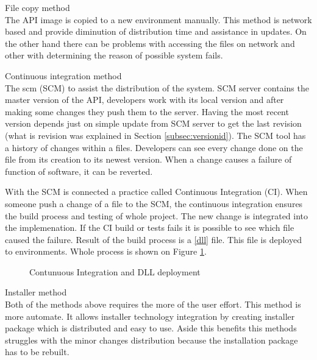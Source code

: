 \begin{description}
  \item{File copy method} \hfill \\
  The API image is copied to a new environment manually. This method is network based and provide diminution of distribution time and assistance in updates. On the other hand there can be problems with accessing the files on network and other with determining the reason of possible system fails. 
  \item{Continuous integration method} \hfill \\
  The \gls{scm} (SCM) to assist the distribution of the system. SCM server contains the master version of the API, developers work with its local version and after making some changes they push them to the server. Having the most recent version depends just on simple update from SCM server to get the last revision (what is revision was explained in Section \ref{subsec:versionid}). The SCM tool has a history of changes within a files. Developers can see every change done on the file from its creation to its newest version. When a change causes a failure of function of software, it can be reverted.
  
  With the SCM is connected a practice called Continuous Integration (CI). When someone push a change of a file to the SCM, the continuous integration ensures the build process and testing of whole project. The new change is integrated into the implemenation. If the CI build or tests fails it is possible to see which file caused the failure. 
  Result of the build process is a \ref{dll} file. This file is deployed to environments. Whole process is shown on Figure \ref{fig:deployment-process}.
  
\begin{figure}[htp] 
\caption{Contunuous Integration and DLL deployment}
\label{fig:deployment-process}
\end{figure} 
   
  \item{Installer method} \hfill \\
  Both of the methods above requires the more of the user effort. This method is more automate. It allows installer technology integration by creating installer package which is distributed and easy to use. Aside this benefits this methods struggles with the minor changes distribution because the installation package has to be rebuilt.
\end{description}


